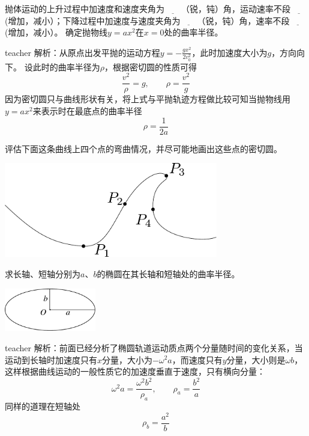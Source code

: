 \begin{example}
抛体运动的上升过程中加速度和速度夹角为$\underline{\qquad }$（锐，钝）角，运动速率不段$\underline{\qquad }$(增加，减小）；下降过程中加速度与速度夹角为$\underline{\qquad }$（锐，钝）角，速率不段$\underline{\qquad }$(增加，减小）。
确定抛物线$y = ax^2$在$x=0$处的曲率半径。
\begin{taggedblock}{teacher}
\newline
解析：从原点出发平抛的运动方程$y=-\frac{gx^2}{2v_0^2}$，此时加速度大小为$g$，方向向下。
设此时的曲率半径为$\rho$，根据密切圆的性质可得
\[
\frac{v^2}{\rho} = g,\qquad \rho = \frac{v^2}{g}
\]
因为密切圆只与曲线形状有关，将上式与平抛轨迹方程做比较可知当抛物线用$y = ax^2$来表示时在最底点的曲率半径
\[
\rho = \frac{1}{2a}
\]

\end{taggedblock}
\end{example}

\begin{example}
评估下面这条曲线上四个点的弯曲情况，并尽可能地画出这些点的密切圆。
\begin{center}
\includegraphics[width=0.7\textwidth]{images/motion-problem-curved-lines-radius.pdf} 
\end{center}


\end{example}

\begin{example}
求长轴、短轴分别为$a、b$的椭圆在其长轴和短轴处的曲率半径。
\begin{flushright}
\includegraphics[width=0.3\textwidth]{images/motion-problem-45.pdf}
\end{flushright}
\begin{taggedblock}{teacher}
\noindent
解析：前面已经分析了椭圆轨道运动质点两个分量随时间的变化关系，当运动到长轴时加速度只有$x$分量，大小为$-\omega^2 a$，而速度只有$y$分量，大小则是$\omega b$，这样根据曲线运动的一般性质它的加速度垂直于速度，只有横向分量：
\[
\omega^2a = \frac{\omega^2b^2}{\rho_a},\qquad \rho_a = \frac{b^2}{a}
\]
同样的道理在短轴处
\[
\rho_b = \frac{a^2}{b}
\]
\end{taggedblock}
\end{example}

